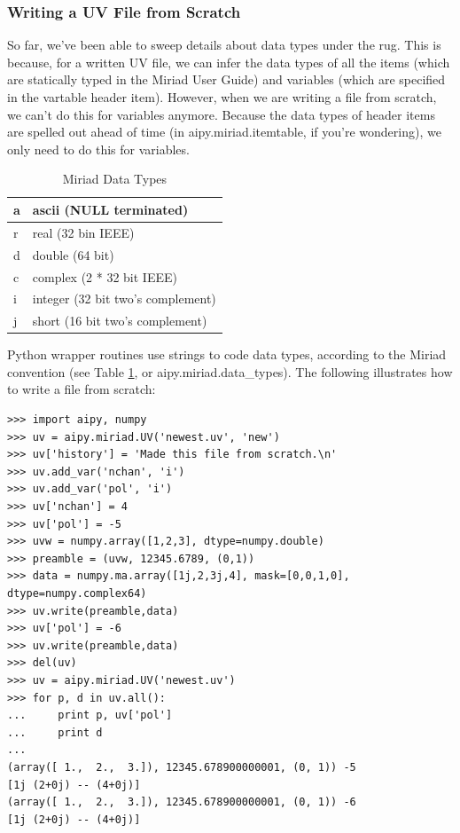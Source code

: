 \subsubsection{Writing a UV File from Scratch}

So far, we've been able to sweep details about data types under the rug.
This is because, for a written UV file, we can infer the data types of all
the items (which are statically typed in the Miriad User Guide) and variables 
(which are specified in the vartable header item).  However, when we are
writing a file from scratch, we can't do this for variables anymore.  Because
the data types of header items are spelled out ahead of time (in
aipy.miriad.itemtable, if you're wondering), we only need to do this for
variables.

\begin{table}[ht]
\caption{Miriad Data Types}
\centering
\begin{tabular}{|l|l|}
\hline
a & ascii (NULL terminated)\\
\hline
r & real (32 bin IEEE)\\
\hline
d & double (64 bit)\\
\hline
c & complex (2 * 32 bit IEEE)\\
\hline
i & integer (32 bit two's complement)\\
\hline
j & short (16 bit two's complement)\\
\hline
\end{tabular}
\label{tbl:data_types}
\end{table}

Python wrapper routines use strings to code data types, according
to the Miriad convention (see Table \ref{tbl:data_types}, or
aipy.miriad.data\_types).  The following illustrates how to write a file
from scratch:

\begin{verbatim}
>>> import aipy, numpy
>>> uv = aipy.miriad.UV('newest.uv', 'new')
>>> uv['history'] = 'Made this file from scratch.\n'
>>> uv.add_var('nchan', 'i')
>>> uv.add_var('pol', 'i')
>>> uv['nchan'] = 4
>>> uv['pol'] = -5
>>> uvw = numpy.array([1,2,3], dtype=numpy.double)
>>> preamble = (uvw, 12345.6789, (0,1))
>>> data = numpy.ma.array([1j,2,3j,4], mask=[0,0,1,0], dtype=numpy.complex64)
>>> uv.write(preamble,data)
>>> uv['pol'] = -6
>>> uv.write(preamble,data)
>>> del(uv)
>>> uv = aipy.miriad.UV('newest.uv')
>>> for p, d in uv.all():
...     print p, uv['pol']
...     print d
...
(array([ 1.,  2.,  3.]), 12345.678900000001, (0, 1)) -5
[1j (2+0j) -- (4+0j)]
(array([ 1.,  2.,  3.]), 12345.678900000001, (0, 1)) -6
[1j (2+0j) -- (4+0j)]
\end{verbatim}

